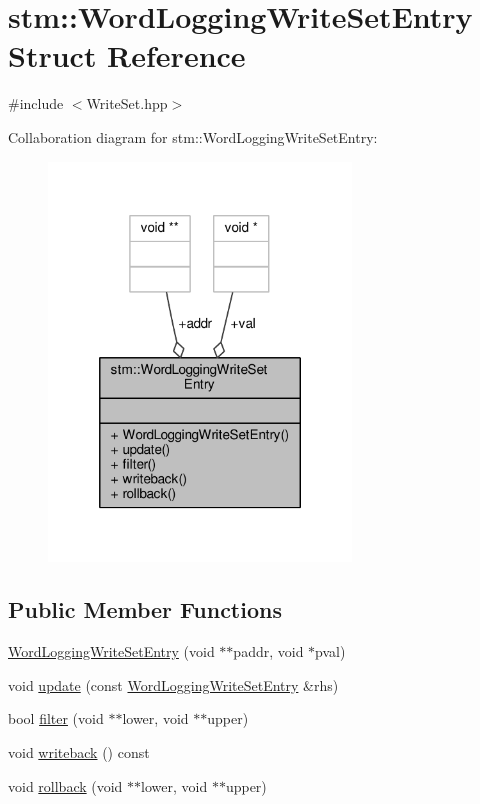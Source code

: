 \hypertarget{structstm_1_1WordLoggingWriteSetEntry}{\section{stm\-:\-:Word\-Logging\-Write\-Set\-Entry Struct Reference}
\label{structstm_1_1WordLoggingWriteSetEntry}
}


{\ttfamily \#include $<$Write\-Set.\-hpp$>$}



Collaboration diagram for stm\-:\-:Word\-Logging\-Write\-Set\-Entry\-:
\nopagebreak
\begin{figure}[H]
\begin{center}
\leavevmode
\includegraphics[width=228pt]{structstm_1_1WordLoggingWriteSetEntry__coll__graph}
\end{center}
\end{figure}
\subsection*{Public Member Functions}
\begin{DoxyCompactItemize}
\item 
\hyperlink{structstm_1_1WordLoggingWriteSetEntry_aafb8d936edd5c4553c640288adff67aa}{Word\-Logging\-Write\-Set\-Entry} (void $\ast$$\ast$paddr, void $\ast$pval)
\item 
void \hyperlink{structstm_1_1WordLoggingWriteSetEntry_ad25a91c48b04b5468b8c531852a8c8cb}{update} (const \hyperlink{structstm_1_1WordLoggingWriteSetEntry}{Word\-Logging\-Write\-Set\-Entry} \&rhs)
\item 
bool \hyperlink{structstm_1_1WordLoggingWriteSetEntry_ad4f2d8c2d109a81a6eaddd58a0341fef}{filter} (void $\ast$$\ast$lower, void $\ast$$\ast$upper)
\item 
void \hyperlink{structstm_1_1WordLoggingWriteSetEntry_a4b364b08c9dd468cb76b4a6cc99a97f4}{writeback} () const 
\item 
void \hyperlink{structstm_1_1WordLoggingWriteSetEntry_a20a5c10674dd8076eb47b1de667c3103}{rollback} (void $\ast$$\ast$lower, void $\ast$$\ast$upper)
\end{DoxyCompactItemize}
